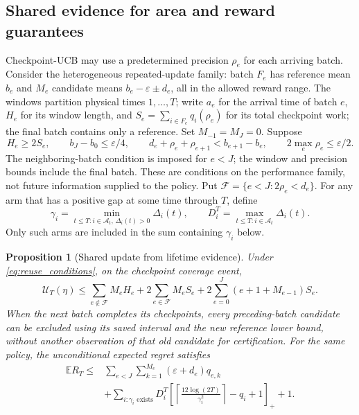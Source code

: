 \documentclass[11pt]{article}
\newtheorem{proposition}[theorem]{Proposition}
\theoremstyle{remark}
\newcommand{\E}{\mathbb E}
\begin{document}
\subsection{Shared evidence for area and reward guarantees}

Checkpoint-UCB may use a predetermined precision $\rho_e$ for each arriving
batch. Consider the heterogeneous repeated-update family: batch $F_e$ has
reference mean $b_e$ and $M_e$ candidate means
$b_e-\varepsilon\pm d_e$, all in the allowed reward range. The windows
partition physical times $1,\ldots,T$; write $a_e$ for the arrival time of
batch $e$, $H_e$ for its window length, and
$S_e=\sum_{i\in F_e}q_i(\rho_e)$ for its total checkpoint work; the final
batch contains only a reference. Set $M_{-1}=M_J=0$. Suppose
\begin{equation}
 H_e\ge2S_e,\qquad b_J-b_0\le\varepsilon/4,\qquad
 d_e+\rho_e+\rho_{e+1}<b_{e+1}-b_e,\qquad
 2\max_e\rho_e\le\varepsilon/2.
 \label{eq:reuse_conditions}
\end{equation}
The neighboring-batch condition is imposed for $e<J$; the window and
precision bounds include the final batch. These are conditions on the
performance family, not future information supplied to the policy. Put
$\mathcal F=\{e<J:2\rho_e<d_e\}$. For any arm that has a positive gap at
some time through $T$, define
\[
 \gamma_i=\min_{t\le T:i\in\mathcal A_t,\,\Delta_i(t)>0}\Delta_i(t),
 \qquad
 D_i^T=\max_{t\le T:i\in\mathcal A_t}\Delta_i(t).
\]
Only such arms are included in the sum containing $\gamma_i$ below.

\begin{proposition}[Shared update from lifetime evidence]
\label{thm:reuse}
Under \eqref{eq:reuse_conditions}, on the checkpoint coverage event,
\begin{equation}
 \mathcal U_T(\eta)\le
 \sum_{e\notin\mathcal F}M_eH_e+
 2\sum_{e\in\mathcal F}M_eS_e+
 2\sum_{e=0}^J(e+1+M_{e-1})S_e.
 \label{eq:reuse_area}
\end{equation}
When the next batch completes its checkpoints, every preceding-batch candidate
can be excluded using its saved interval and the new reference lower bound,
without another observation of that old candidate for certification.
For the same policy, the unconditional expected regret satisfies
\begin{equation}
 \begin{aligned}
 \E R_T\le{}&\sum_{e<J}\sum_{k=1}^{M_e}(\varepsilon+d_e)q_{e,k}\\
 &+\sum_{i:\gamma_i\text{ exists}}D_i^T
 \left[\left\lceil\frac{12\log(2T)}{\gamma_i^2}\right\rceil-q_i+1\right]_+
 +1.
 \end{aligned}
 \label{eq:reuse_regret}
\end{equation}
\end{proposition}
\end{document}
